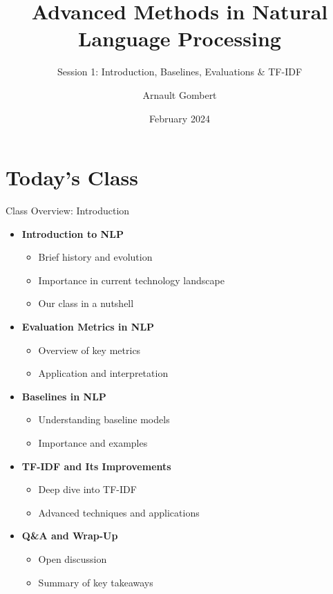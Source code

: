 \documentclass{beamer}
\title{Advanced Methods in Natural Language Processing}
\subtitle{Session 1: Introduction, Baselines, Evaluations \& TF-IDF}
\author[Arnault Gombert]{Arnault Gombert}
\institute[shortinst]{Barcelona School of Economics}
\date{February 2024}
\begin{document}
\begin{frame}
\titlepage %
\end{frame}



\section{Today's Class}

\begin{frame}{Class Overview: Introduction}

\begin{itemize}
  \item \textbf{Introduction to NLP}
    \begin{itemize}
      \item Brief history and evolution
      \item Importance in current technology landscape
      \item Our class in a nutshell
    \end{itemize}
  \item \textbf{Evaluation Metrics in NLP}
    \begin{itemize}
      \item Overview of key metrics
      \item Application and interpretation
    \end{itemize}
  \item \textbf{Baselines in NLP}
    \begin{itemize}
      \item Understanding baseline models
      \item Importance and examples
    \end{itemize}
  \item \textbf{TF-IDF and Its Improvements}
    \begin{itemize}
      \item Deep dive into TF-IDF
      \item Advanced techniques and applications
    \end{itemize}
  \item \textbf{Q&A and Wrap-Up}
    \begin{itemize}
      \item Open discussion
      \item Summary of key takeaways
    \end{itemize}
\end{itemize}

\end{frame}
\end{document}
